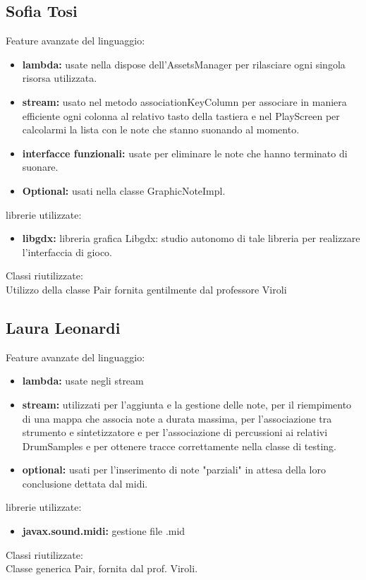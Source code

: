 \documentclass[a4paper,12pt]{report}
\begin{document}
\subsection{Sofia Tosi}
Feature avanzate del linguaggio:
\begin{itemize}
	\item \textbf{lambda:} usate nella dispose dell'AssetsManager per rilasciare ogni singola risorsa utilizzata.
	\item \textbf{stream:} usato nel metodo associationKeyColumn per associare in maniera efficiente ogni colonna al relativo tasto della tastiera e nel PlayScreen per calcolarmi la lista con le note che stanno suonando al momento.
	\item \textbf{interfacce funzionali:} usate per eliminare le note che hanno terminato di suonare.
	\item \textbf{Optional:} usati nella classe GraphicNoteImpl.
\end{itemize}
librerie utilizzate:
\begin{itemize}
	\item \textbf{libgdx:} libreria grafica Libgdx: studio autonomo di tale libreria per realizzare l'interfaccia di gioco.
\end{itemize}
Classi riutilizzate: \\
Utilizzo della classe Pair fornita gentilmente dal professore Viroli
\newpage

\newpage

\subsection{Laura Leonardi}
Feature avanzate del linguaggio:
\begin{itemize}
	\item \textbf{lambda:} usate negli stream
	\item \textbf{stream:} utilizzati per l'aggiunta e la gestione delle note, per il riempimento di una mappa che associa note a durata massima, per l'associazione tra strumento e sintetizzatore e per l'associazione di percussioni ai relativi DrumSamples e per ottenere tracce correttamente nella classe di testing.
	\item \textbf{optional:} usati per l'inserimento di note "parziali" in attesa della loro conclusione dettata dal midi.
\end{itemize}
librerie utilizzate:
\begin{itemize}
	\item \textbf{javax.sound.midi:} gestione file .mid
\end{itemize}
Classi riutilizzate: \\
Classe generica Pair, fornita dal prof. Viroli.
\newpage
\end{document}
